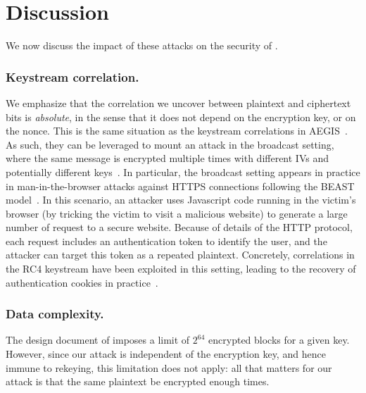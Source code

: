 

\section{Discussion}
\label{sec/Discussion}


We now discuss the impact of these attacks on the security of \MORUS.

\subsubsection{Keystream correlation.}

We emphasize that the correlation we uncover between plaintext and ciphertext bits is
\emph{absolute}, in the sense that it does not depend on the encryption
key, or on the nonce.  This is the same situation as the keystream correlations
in AEGIS~\cite{sacryptMinaud14}.  As such, they can be leveraged to
mount an attack in the broadcast setting, where the same message is
encrypted multiple times with different IVs and potentially different
keys~\cite{DBLP:conf/fse/MantinS01}.  In particular, the broadcast setting appears
in practice in man-in-the-browser attacks against HTTPS connections
following the BEAST model~\cite{duong2011here}.  In this scenario, an
attacker uses Javascript code running in the victim's browser (by
tricking the victim to visit a malicious website) to generate a large
number of request to a secure website.  Because of details of the HTTP
protocol, each request includes an authentication token to identify the
user, and the attacker can target this token as a repeated plaintext.
Concretely, correlations in the RC4 keystream have been exploited in this
setting, leading to the recovery of authentication cookies in
practice~\cite{DBLP:conf/uss/AlFardanBPPS13}.

\subsubsection{Data complexity.}

The design document of  imposes a limit of $2^{64}$
encrypted blocks for a given key. However, since our attack is
independent of the encryption key, and hence immune to rekeying, this
limitation does not apply: all that matters for our attack is that the
same plaintext be encrypted enough times.

